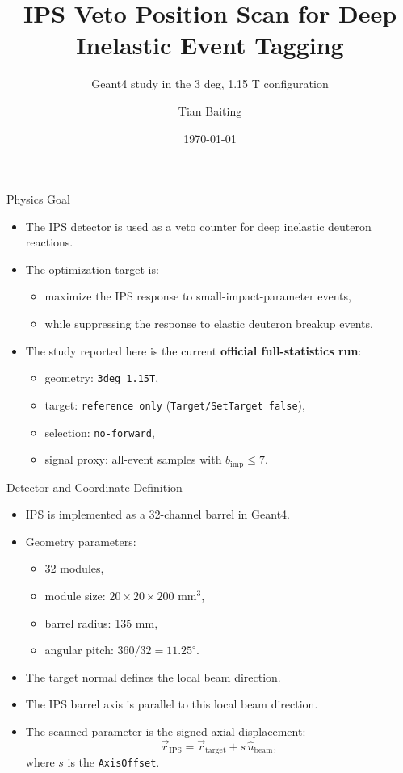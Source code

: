 \documentclass[aspectratio=169]{beamer}
\title[IPS Veto Position Scan]{IPS Veto Position Scan for Deep Inelastic Event Tagging}
\subtitle{Geant4 study in the 3 deg, 1.15 T configuration}
\author{Tian Baiting}
\date{\today}
\begin{document}
\begin{frame}
\titlepage
\end{frame}

\begin{frame}{Physics Goal}
\begin{itemize}
  \item The IPS detector is used as a veto counter for deep inelastic deuteron reactions.
  \item The optimization target is:
  \begin{itemize}
    \item maximize the IPS response to small-impact-parameter events,
    \item while suppressing the response to elastic deuteron breakup events.
  \end{itemize}
  \item The study reported here is the current \textbf{official full-statistics run}:
  \begin{itemize}
    \item geometry: \texttt{3deg\_1.15T},
    \item target: \texttt{reference only} (\texttt{Target/SetTarget false}),
    \item selection: \texttt{no-forward},
    \item signal proxy: all-event samples with $b_{\mathrm{imp}} \le 7$.
  \end{itemize}
\end{itemize}
\end{frame}



\begin{frame}{Detector and Coordinate Definition}
\begin{itemize}
  \item IPS is implemented as a 32-channel barrel in Geant4.
  \item Geometry parameters:
  \begin{itemize}
    \item 32 modules,
    \item module size: $20 \times 20 \times 200$ mm$^3$,
    \item barrel radius: 135 mm,
    \item angular pitch: $360 / 32 = 11.25^\circ$.
  \end{itemize}
  \item The target normal defines the local beam direction.
  \item The IPS barrel axis is parallel to this local beam direction.
  \item The scanned parameter is the signed axial displacement:
  \[
    \vec{r}_{\mathrm{IPS}} = \vec{r}_{\mathrm{target}} + s \, \hat{u}_{\mathrm{beam}},
  \]
  where $s$ is the \texttt{AxisOffset}.
\end{itemize}
\end{frame}
\end{document}
